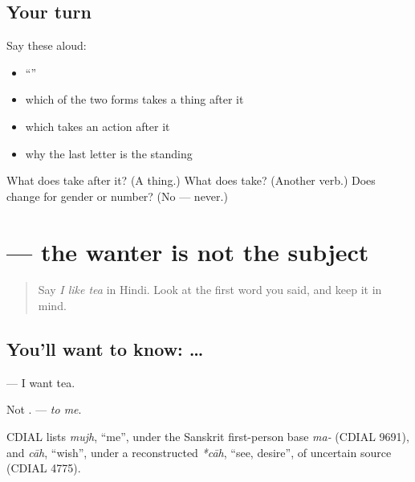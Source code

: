 \subsection*{Your turn}
Say these aloud:

\begin{itemize}
\raggedright
  \item \textquotedblleft{}\textquotedblright{}
  \item which of the two forms takes a thing after it
  \item which takes an action after it
  \item why the last letter is the standing \textbf{}
\end{itemize}

\begin{tcolorbox}[breakable,colback=teal!4,colframe=teal!35!black,title={Before you move on}]
What does \textbf{} take after it? (A thing.) What does \textbf{} take? (Another verb.) Does \textbf{} change for gender or number? (No — never.)
\end{tcolorbox}
\section[\texorpdfstring{\hi{मुझे} \hi{चाय} \hi{चाहिए} (mujhe cāy cāhiye)}{मुझे चाय चाहिए (mujhe cāy cāhiye)}]{   — the wanter is not the subject}

\label{lesson:HI-C95-mujhe-chahiye}



\begin{quote}
Say \emph{I like tea} in Hindi. Look at the first word you said, and keep it in mind.
\end{quote}

\subsection*{You'll want to know:  … }
\textbf{  } — I want tea.

Not \textbf{}. \textbf{} — \emph{to me}.

\begin{cousinweb}
CDIAL lists \emph{mujh}, \textquotedblleft{}me\textquotedblright{}, under the Sanskrit first-person base \emph{ma-} (CDIAL 9691), and \emph{cāh}, \textquotedblleft{}wish\textquotedblright{}, under a reconstructed \emph{*cāh}, \textquotedblleft{}see, desire\textquotedblright{}, of uncertain source (CDIAL 4775).
\end{cousinweb}


